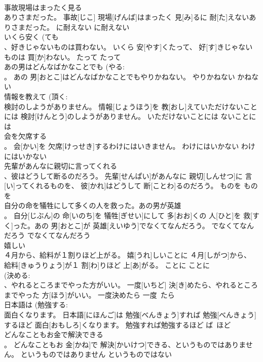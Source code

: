 \documentclass[8pt]{extreport}
\begin{document}
\begin{CJK}{UTF8}{min}
\\	事故現場はまったく見る 
\\	ありさまだった。	事故[じこ] 現場[げんば]はまったく 見[み]るに 耐[た]えないありさまだった。	に耐えない	に耐えない	
\\	いくら安く (ても 
\\	、好きじゃないものは買わない。	いくら 安[やす]くたって、 好[す]きじゃないものは 買[か]わない。	たって	たって	
\\	あの男はどんなばかなことでも (やる: 
\\	。	あの 男[おとこ]はどんなばかなことでもやりかねない。	やりかねない	かねない	
\\	情報を教えて (頂く: 
\\	検討のしようがありません。	情報[じょうほう]を 教[おし]えていただけないことには 検討[けんとう]のしようがありません。	いただけないことには	ないことには	
\\	会を欠席する 
\\	。	会[かい]を 欠席[けっせき]するわけにはいきません。	わけにはいかない	わけにはいかない	
\\	先輩があんなに親切に言ってくれる 
\\	、彼はどうして断るのだろう。	先輩[せんぱい]があんなに 親切[しんせつ]に 言[い]ってくれるものを、 彼[かれ]はどうして 断[ことわ]るのだろう。	ものを	ものを	
\\	自分の命を犠牲にして多くの人を救った。あの男が英雄 
\\	。	自分[じぶん]の 命[いのち]を 犠牲[ぎせい]にして 多[おお]くの 人[ひと]を 救[すく]った。あの 男[おとこ]が 英雄[えいゆう]でなくてなんだろう。	でなくてなんだろう	でなくてなんだろう	
\\	嬉しい 
\\	４月から、給料が１割りほど上がる。	嬉[うれ]しいことに ４月[しがつ]から、 給料[きゅうりょう]が１ 割[わ]りほど 上[あ]がる。	ことに	ことに	
\\	(決める: 
\\	、やれるところまでやった方がいい。	一度[いちど] 決[き]めたら、やれるところまでやった 方[ほう]がいい。	一度決めたら	一度~たら~	
\\	日本語は (勉強する: 
\\	面白くなります。	日本語[にほんご]は 勉強[べんきょう]すれば 勉強[べんきょう]するほど 面白[おもしろ]くなります。	勉強すれば勉強するほど	ば~ほど	
\\	どんなこともお金で解決できる 
\\	。	どんなこともお 金[かね]で 解決[かいけつ]できる、というものではありません。	というものではありません	というものではない	

\end{CJK}
\end{document}
